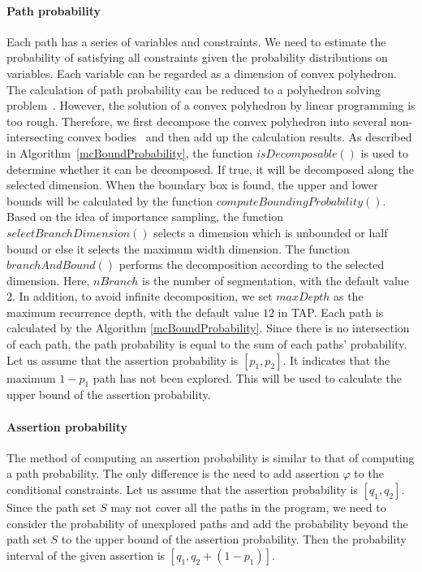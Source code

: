 \documentclass[sigconf,review, anonymous]{acmart}
\begin{document}
\paragraph{Path probability} Each path has a series of variables and constraints. We need to estimate the probability of satisfying all constraints given the probability distributions on variables. Each variable can be regarded as a dimension of convex polyhedron. The calculation of path probability can be reduced to a polyhedron solving problem~\cite{Visser2012Green}. However, the solution of a convex polyhedron by linear programming is too rough. Therefore, we first decompose the convex polyhedron into several non-intersecting convex bodies~\cite{Bingsheng2020} and then add up the calculation results. As described in Algorithm~\ref{mcBoundProbability}, the function $isDecomposable()$  is used to determine whether it can be decomposed. If true, it will be decomposed along the selected dimension. When the boundary box is found, the upper and lower bounds will be calculated by the function $computeBoundingProbability()$. Based on the idea of importance sampling, the function $selectBranchDimension()$ selects a dimension which is unbounded or half bound or else it selects the maximum width dimension. The function $branchAndBound()$ performs the decomposition according to the selected dimension. Here, $nBranch$ is the number of segmentation, with the default value $2$. In addition, to avoid infinite decomposition, we set $maxDepth$ as the maximum recurrence depth, with the default value $12$ in TAP. Each path is calculated by the Algorithm \ref{mcBoundProbability}. Since there is no intersection of each path, the path probability is equal to the sum of each paths' probability. Let us assume that the assertion probability is $[p_1,p_2]$. It indicates that the maximum $1-p_1$ path has not been explored. This will be used to calculate the upper bound of the assertion probability.


\paragraph{Assertion probability} The method of computing an assertion probability is similar to that of computing a path probability. The only difference is the need to add assertion $\varphi$ to the conditional constraints. Let us assume that the assertion probability is $[q_1,q_2]$. Since the path set $S$ may not cover all the paths in the program, we need to consider the probability of unexplored paths and add the probability beyond the path set $S$ to the upper bound of the assertion probability. Then the probability interval of the given assertion is $[q_1,q_2+(1-p_1)]$.
\end{document}
